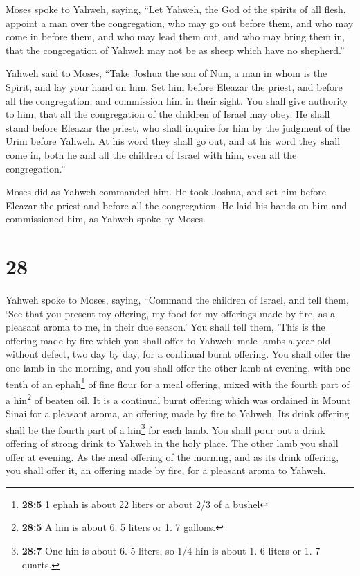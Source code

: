  Moses spoke to Yahweh, saying,  ``Let
Yahweh, the God of the spirits of all flesh, appoint a man over the
congregation,  who may go out before them, and who may
come in before them, and who may lead them out, and who may bring them
in, that the congregation of Yahweh may not be as sheep which have no
shepherd.''

 Yahweh said to Moses, ``Take Joshua the son of Nun, a
man in whom is the Spirit, and lay your hand on him.  Set
him before Eleazar the priest, and before all the congregation; and
commission him in their sight.  You shall give authority
to him, that all the congregation of the children of Israel may obey.
 He shall stand before Eleazar the priest, who shall
inquire for him by the judgment of the Urim before Yahweh. At his word
they shall go out, and at his word they shall come in, both he and all
the children of Israel with him, even all the congregation.''

 Moses did as Yahweh commanded him. He took Joshua, and
set him before Eleazar the priest and before all the congregation.
 He laid his hands on him and commissioned him, as Yahweh
spoke by Moses.

\hypertarget{section-27}{%
\section{28}\label{section-27}}

 Yahweh spoke to Moses, saying,  ``Command
the children of Israel, and tell them, `See that you present my
offering, my food for my offerings made by fire, as a pleasant aroma to
me, in their due season.'  You shall tell them, 'This is
the offering made by fire which you shall offer to Yahweh: male lambs a
year old without defect, two day by day, for a continual burnt offering.
 You shall offer the one lamb in the morning, and you
shall offer the other lamb at evening,  with one tenth of
an ephah\footnote{\textbf{28:5} 1 ephah is about 22 liters or about 2/3
  of a bushel} of fine flour for a meal offering, mixed with the fourth
part of a hin\footnote{\textbf{28:5} A hin is about 6. 5 liters or 1. 7
  gallons.} of beaten oil.  It is a continual burnt
offering which was ordained in Mount Sinai for a pleasant aroma, an
offering made by fire to Yahweh.  Its drink offering shall
be the fourth part of a hin\footnote{\textbf{28:7} One hin is about 6. 5
  liters, so 1/4 hin is about 1. 6 liters or 1. 7 quarts.} for each
lamb. You shall pour out a drink offering of strong drink to Yahweh in
the holy place.  The other lamb you shall offer at
evening. As the meal offering of the morning, and as its drink offering,
you shall offer it, an offering made by fire, for a pleasant aroma to
Yahweh.

